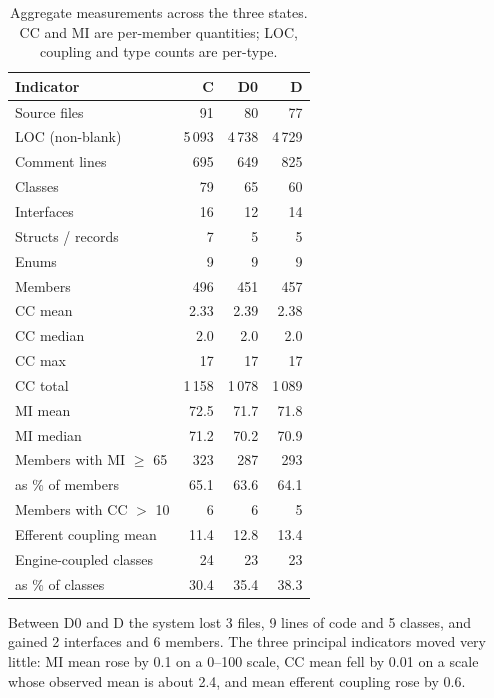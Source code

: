 \documentclass{sbc2019}%
\begin{document}
\begin{table}[!htbp]
\centering
\caption{Aggregate measurements across the three states. CC and MI are
per-member quantities; LOC, coupling and type counts are per-type.}\label{tab:aggregate}
\small
\begin{tabular}{lrrr}
\toprule
\textbf{Indicator} & \textbf{C} & \textbf{D0} & \textbf{D} \\
\midrule
Source files            & 91    & 80    & 77 \\
LOC (non-blank)         & 5\,093 & 4\,738 & 4\,729 \\
Comment lines           & 695   & 649   & 825 \\
Classes                 & 79    & 65    & 60 \\
Interfaces              & 16    & 12    & 14 \\
Structs / records       & 7     & 5     & 5 \\
Enums                   & 9     & 9     & 9 \\
Members                 & 496   & 451   & 457 \\
\addlinespace
CC mean                 & 2.33  & 2.39  & 2.38 \\
CC median               & 2.0   & 2.0   & 2.0 \\
CC max                  & 17    & 17    & 17 \\
CC total                & 1\,158 & 1\,078 & 1\,089 \\
\addlinespace
MI mean                 & 72.5  & 71.7  & 71.8 \\
MI median               & 71.2  & 70.2  & 70.9 \\
Members with MI $\geq$ 65 & 323 & 287   & 293 \\
\quad as \% of members   & 65.1  & 63.6  & 64.1 \\
Members with CC $>$ 10   & 6     & 6     & 5 \\
\addlinespace
Efferent coupling mean  & 11.4  & 12.8  & 13.4 \\
Engine-coupled classes  & 24    & 23    & 23 \\
\quad as \% of classes  & 30.4  & 35.4  & 38.3 \\
\bottomrule
\end{tabular}
\end{table}

Between D0 and D the system lost 3 files, 9 lines of code and 5 classes, and
gained 2 interfaces and 6 members. The three principal indicators moved very
little: MI mean rose by 0.1 on a 0--100 scale, CC mean fell by 0.01 on a scale
whose observed mean is about 2.4, and mean efferent coupling rose by 0.6.
\end{document}
